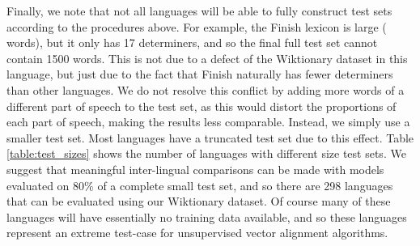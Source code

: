 \documentclass[11pt]{article}
\begin{document}
Finally, we note that not all languages will be able to fully construct test sets according to the procedures above.
For example, the Finish lexicon is large ( words), but it only has 17 determiners, and so the final full test set cannot contain 1500 words.
This is not due to a defect of the Wiktionary dataset in this language, but just due to the fact that Finish naturally has fewer determiners than other languages.
We do not resolve this conflict by adding more words of a different part of speech to the test set, as this would distort the proportions of each part of speech, making the results less comparable.
Instead, we simply use a smaller test set.
Most languages have a truncated test set due to this effect.
Table \ref{table:test_sizes} shows the number of languages with different size test sets.
We suggest that meaningful inter-lingual comparisons can be made with models evaluated on 80\% of a complete small test set,
and so there are 298 languages that can be evaluated using our Wiktionary dataset.
Of course many of these languages will have essentially no training data available,
and so these languages represent an extreme test-case for unsupervised vector alignment algorithms.



%

\end{document}
